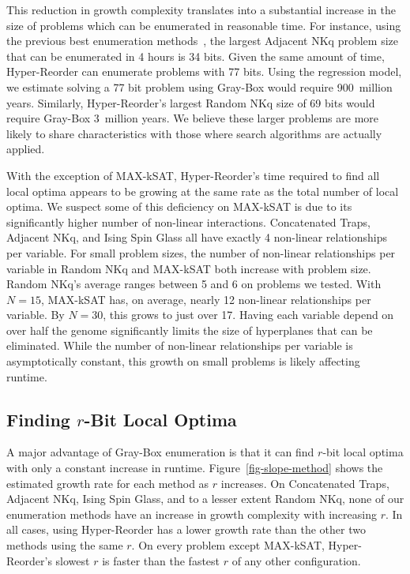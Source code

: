 \documentclass[runningheads,a4paper]{llncs}
\begin{document}
This reduction in growth complexity translates into a substantial increase in the size of problems
which can be enumerated in reasonable time. For instance, using the previous best enumeration methods~\cite{ochoa:2015:crossovernetworks},
the largest Adjacent NKq problem size that can be enumerated in 4 hours is 34 bits. Given the same amount of time,
Hyper-Reorder can enumerate problems with 77 bits. Using the regression model, we estimate solving
a 77 bit problem using Gray-Box would require 900~million years. Similarly, Hyper-Reorder's largest
Random NKq size of 69 bits would require Gray-Box 3~million years. We believe these larger problems
are more likely to share characteristics with those where search algorithms are actually applied.

With the exception of MAX-kSAT, Hyper-Reorder's time required to find all local optima
appears to be growing at the same rate as the total number of local optima. We suspect
some of this deficiency on MAX-kSAT is due to its significantly higher number of non-linear
interactions. Concatenated Traps, Adjacent NKq, and Ising Spin Glass all have exactly 4
non-linear relationships per variable. For small problem sizes,
the number of non-linear relationships per variable in
Random NKq and MAX-kSAT both increase with problem
size. Random NKq's average ranges between 5 and 6 on problems we tested.
With $N=15$, MAX-kSAT has, on average, nearly
12 non-linear relationships per variable. By $N=30$, this grows to just over 17. Having each
variable depend on over half the genome significantly limits the size of hyperplanes that
can be eliminated. While the number of non-linear relationships per variable
is asymptotically constant, this growth on small problems is likely affecting runtime.


\subsection{Finding $r$-Bit Local Optima}
\label{sec-r-bit}
A major advantage of Gray-Box enumeration is that it can find $r$-bit local optima
with only a constant increase in runtime. Figure~\ref{fig-slope-method}
shows the estimated growth rate for each method as $r$ increases. On Concatenated Traps,
Adjacent NKq, Ising Spin Glass, and to a lesser extent Random NKq, none of our enumeration
methods have an increase in growth complexity with increasing $r$. In all cases, using Hyper-Reorder
has a lower growth rate than the other two methods using the same $r$. On every problem
except MAX-kSAT, Hyper-Reorder's slowest $r$ is faster than the fastest $r$
of any other configuration.
\end{document}
